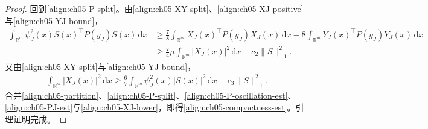 \documentclass[../../main.tex]{subfiles}
\begin{document}
\begin{proof}
回到\eqref{align:ch05-P-split}。由\eqref{align:ch05-XY-split}、\eqref{align:ch05-XJ-positive}与\eqref{align:ch05-YJ-bound}，
\begin{align}
\int_{\mathbb{R}^{m}}\psi_{J}^{2}(x)S(x)^{\top}P(y_{J})S(x)\,\mathrm{d}x
&\geqslant\frac{7}{8}\int_{\mathbb{R}^{m}}X_{J}(x)^{\top}P(y_{J})X_{J}(x)\,\mathrm{d}x-8\int_{\mathbb{R}^{m}}Y_{J}(x)^{\top}P(y_{J})Y_{J}(x)\,\mathrm{d}x\nonumber\\
&\geqslant\frac{7}{4}\mu\int_{\mathbb{R}^{m}}|X_{J}(x)|^{2}\,\mathrm{d}x-c_{2}\|S\|_{-1}^{2}.\label{align:ch05-PJ-est}
\end{align}
又由\eqref{align:ch05-XY-split}与\eqref{align:ch05-YJ-bound}，
\begin{align}
\int_{\mathbb{R}^{m}}|X_{J}(x)|^{2}\,\mathrm{d}x\geqslant\frac{6}{7}\int_{\mathbb{R}^{m}}\psi_{J}^{2}(x)|S(x)|^{2}\,\mathrm{d}x-c_{3}\|S\|_{-1}^{2}.\label{align:ch05-XJ-lower}
\end{align}
合并\eqref{align:ch05-partition}、\eqref{align:ch05-P-split}、\eqref{align:ch05-P-oscillation-est}、\eqref{align:ch05-PJ-est}与\eqref{align:ch05-XJ-lower}，即得\eqref{align:ch05-compactness-est}。引理证明完成。
\end{proof}
\end{document}
